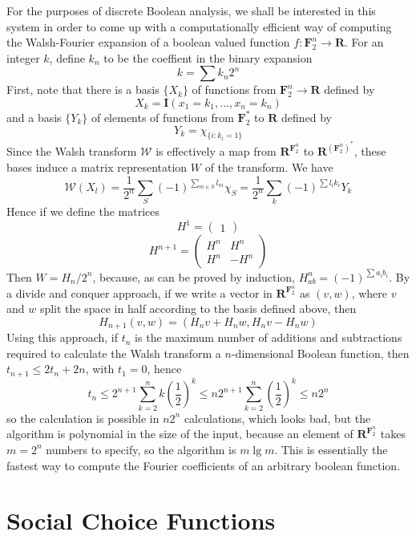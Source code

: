 For the purposes of discrete Boolean analysis, we shall be interested in this system in order to come up with a computationally efficient way of computing the Walsh-Fourier expansion of a boolean valued function $f: \mathbf{F}_2^n \to \mathbf{R}$. For an integer $k$, define $k_n$ to be the coeffient in the binary expansion
%
\[ k = \sum k_n 2^n \]
%
First, note that there is a basis $\{ X_k \}$ of functions from $\mathbf{F}_2^n \to \mathbf{R}$ defined by
%
\[ X_k = \mathbf{I}(x_1 = k_1, \dots, x_n = k_n) \]
%
and a basis $\{ Y_k \}$ of elements of functions from $\mathbf{F}_2^*$ to $\mathbf{R}$ defined by
%
\[ Y_k = \chi_{\{ i : k_i = 1 \}}  \]
%
Since the Walsh transform $\mathcal{W}$ is effectively a map from $\mathbf{R}^{\mathbf{F}^n_2}$ to $\mathbf{R}^{(\mathbf{F}^n_2)^*}$, these bases induce a matrix representation $W$ of the transform. We have
%
\[ \mathcal{W}(X_l) = \frac{1}{2^n} \sum_S (-1)^{\sum_{m \in S} l_m} \chi_S = \frac{1}{2^n} \sum_k (-1)^{\sum l_i k_i} Y_k \]
%
Hence if we define the matrices
%
\[ H^1 = \begin{pmatrix} 1 \end{pmatrix} \]
\[ H^{n+1} = \begin{pmatrix} H^n & H^n \\ H^n & -H^n \end{pmatrix} \]
%
Then $W = H_n/2^n$, because, as can be proved by induction, $H^n_{ab} = (-1)^{\sum a_i b_i}$. By a divide and conquer approach, if we write a vector in $\mathbf{R}^{\mathbf{F}_2^n}$ as $(v,w)$, where $v$ and $w$ split the space in half according to the basis defined above, then
%
\[ H_{n+1}(v,w) = (H_nv + H_nw, H_nv - H_nw) \]
%
Using this approach, if $t_n$ is the maximum number of additions and subtractions required to calculate the Walsh transform a $n$-dimensional Boolean function, then $t_{n+1} \leq 2t_n + 2n$, with $t_1 = 0$, hence
%
\[ t_n \leq 2^{n+1} \sum_{k = 2}^n k \left(\frac{1}{2}\right)^{k} \leq n2^{n+1} \sum_{k = 2}^n \left( \frac{1}{2} \right)^k \leq n2^n \]
%
so the calculation is possible in $n2^n$ calculations, which looks bad, but the algorithm is polynomial in the size of the input, because an element of $\mathbf{R}^{\mathbf{F}_2^n}$ takes $m = 2^n$ numbers to specify, so the algorithm is $m \lg m$. This is essentially the fastest way to compute the Fourier coefficients of an arbitrary boolean function.




\chapter{Social Choice Functions}

